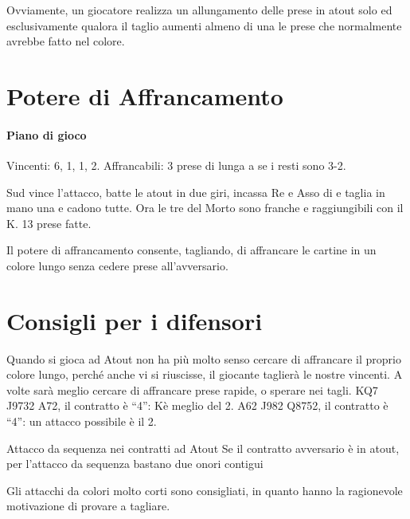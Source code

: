 \documentclass[../corsofiori.tex]{subfiles}
\begin{document}
Ovviamente, un giocatore realizza un allungamento delle prese in atout solo ed esclusivamente qualora il taglio aumenti
almeno di una le prese che normalmente avrebbe fatto nel colore.

\section{Potere di Affrancamento}

\newgame
{}
\leftupper{\boardtext*}%
{\dealertext\quad}{\vulnertext}

\showAll*

\paragraph{Piano di gioco} Vincenti: 6\Sp, 1\He, 1\Di, 2\Cl. Affrancabili: 3 prese di lunga a \fio se i resti sono 3-2.

Sud vince l'attacco, batte le atout in due giri, incassa Re e Asso di \fio e taglia in mano una \fio e cadono tutte. Ora
le tre \fio del Morto sono franche e raggiungibili con il K\He. 13 prese fatte.

Il potere di affrancamento consente, tagliando, di affrancare le cartine in un colore lungo senza cedere prese
all'avversario.

\section{Consigli per i difensori}

Quando si gioca ad Atout non ha più molto senso cercare di affrancare il proprio colore lungo, perché anche vi si
riuscisse, il giocante taglierà le nostre vincenti. A volte sarà meglio cercare di affrancare prese rapide, o sperare
nei tagli.
\Sp KQ7  \Di J9732 \Cl A72, il contratto è “4\He”: K\Sp è meglio del 2\Di.
 \He A62 \Di J982 \Cl Q8752, il contratto è “4\He”: un attacco possibile è il 2\Sp.

\begin{regola}{Attacco da sequenza nei contratti ad Atout}
    Se il contratto avversario è in atout, per l'attacco da sequenza bastano due onori contigui
\end{regola}

Gli attacchi da colori molto corti sono consigliati, in quanto hanno la ragionevole motivazione di provare a tagliare.
\end{document}
